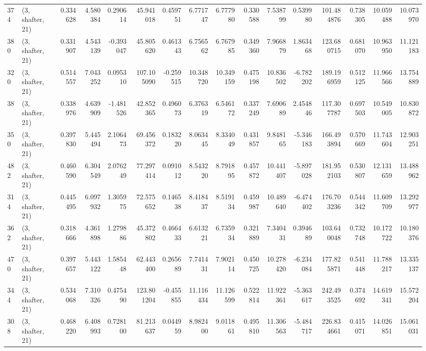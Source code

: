 \begin{tabular}{llrrrrrrrrrrrrrr}
374 &  (3, shafter, 21) &   0.334628 &   4.580384 &   0.290614 &    45.941018 &   0.459751 &   6.771747 &   6.777980 &  0.330588 &   7.538799 &   0.539980 &   101.484876 &  0.738305 &  10.059488 &  10.073970 \\
380 &  (3, shafter, 21) &   0.331907 &   4.543139 &  -0.393047 &    45.805620 &   0.461343 &   6.756562 &   6.767985 &  0.349360 &   7.966879 &   1.863468 &   123.680715 &  0.681070 &  10.963950 &  11.121183 \\
320 &  (3, shafter, 21) &   0.514557 &   7.043252 &   0.095310 &   107.105090 &  -0.259515 &  10.348720 &  10.349159 &  0.475198 &  10.836502 &  -6.782202 &   189.196959 &  0.512125 &  11.966566 &  13.754889 \\
38  &  (3, shafter, 21) &   0.338976 &   4.639909 &  -1.481526 &    42.852365 &   0.496073 &   6.376319 &   6.546172 &  0.337249 &   7.690689 &   2.454846 &   117.307787 &  0.697503 &  10.549005 &  10.830872 \\
350 &  (3, shafter, 21) &   0.397830 &   5.445494 &   2.106473 &    69.456372 &   0.183220 &   8.063445 &   8.334049 &  0.431857 &   9.848165 &  -5.346183 &   166.493894 &  0.570669 &  11.743604 &  12.903251 \\
482 &  (3, shafter, 21) &   0.460590 &   6.304549 &   2.076249 &    77.297414 &   0.091012 &   8.543220 &   8.791895 &  0.457872 &  10.441407 &  -5.897028 &   181.952103 &  0.530807 &  12.131659 &  13.488962 \\
314 &  (3, shafter, 21) &   0.445495 &   6.097932 &   1.305975 &    72.575652 &   0.146538 &   8.418437 &   8.519134 &  0.459987 &  10.489640 &  -6.474402 &   176.703236 &  0.544342 &  11.609709 &  13.292977 \\
362 &  (3, shafter, 21) &   0.318666 &   4.361898 &   1.279886 &    45.372802 &   0.466433 &   6.613221 &   6.735934 &  0.321889 &   7.340431 &   0.394689 &   103.640048 &  0.732748 &  10.172722 &  10.180376 \\
470 &  (3, shafter, 21) &   0.397657 &   5.443122 &   1.585448 &    62.443400 &   0.265689 &   7.741431 &   7.902114 &  0.450725 &  10.278420 &  -6.234084 &   177.825871 &  0.541448 &  11.788217 &  13.335137 \\
344 &  (3, shafter, 21) &   0.534068 &   7.310326 &   0.475490 &   123.801204 &  -0.455855 &  11.116434 &  11.126599 &  0.522814 &  11.922361 &  -5.363617 &   242.493525 &  0.374692 &  14.619341 &  15.572204 \\
308 &  (3, shafter, 21) &   0.468220 &   6.408993 &   0.728100 &    81.213637 &   0.044959 &   8.982400 &   9.011861 &  0.495810 &  11.306563 &  -5.484717 &   226.834661 &  0.415071 &  14.026851 &  15.061031 \\

\end{tabular}
